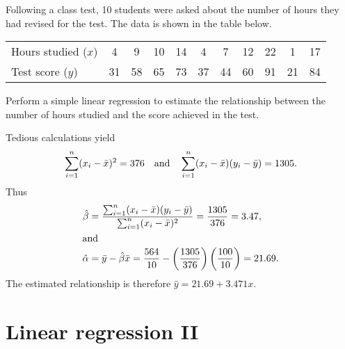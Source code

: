 \begin{exercise}
Following a class test, 10 students were asked about the number of hours they had revised for the test. The data is shown in the table below.
\begin{center}
\begin{tabular}{|l|cccccccccc|} \hline
Hours studied ($x$)	&  4	 &  9 & 10 & 14 &  4 &  7 & 12 & 22 &  1 & 17 \\ 
Test score ($y$)		& 31 & 58 & 65 & 73 & 37 & 44 & 60 & 91 & 21 & 84 \\ \hline
\end{tabular}
\end{center}
Perform a simple linear regression to estimate the relationship between the number of hours studied and the score achieved in the test.
\begin{answer}
%
Tedious calculations yield
\[
\sum_{i=1}^n(x_i-\bar{x})^2  = 376 \text{\quad and\quad} \sum_{i=1}^n (x_i - \bar{x})(y_i - \bar{y}) = 1305.
\]
Thus
\begin{align*}
\hat{\beta}	
	& = \displaystyle\frac{\sum_{i=1}^n (x_i - \bar{x})(y_i - \bar{y})}{\sum_{i=1}^n(x_i-\bar{x})^2} 
	= \displaystyle\frac{1305}{376}	= 3.47,\\	
\intertext{and}
\hat{\alpha}
	& = \displaystyle\bar{y} - \hat{\beta}\bar{x} 
	= \displaystyle\frac{564}{10} - \left(\frac{1305}{376}\right)\left(\frac{100}{10}\right) = 21.69.
\end{align*}
The estimated relationship is therefore $\hat{y} = 21.69 + 3.471 x$.
\end{answer}
\end{exercise}

\section{Linear regression II}\label{sec:slr2}

